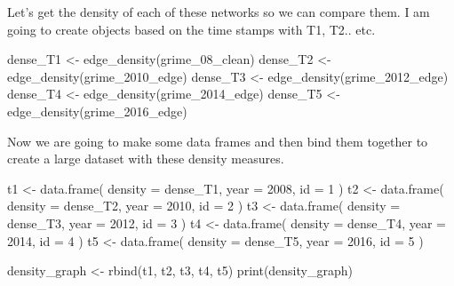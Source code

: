 \documentclass[
  letterpaper,
  DIV=11,
  numbers=noendperiod]{scrreprt}
\newenvironment{Shaded}{\begin{snugshade}}{\end{snugshade}}
\newcommand{\AttributeTok}[1]{\textcolor[rgb]{0.40,0.45,0.13}{#1}}
\newcommand{\DecValTok}[1]{\textcolor[rgb]{0.68,0.00,0.00}{#1}}
\newcommand{\FunctionTok}[1]{\textcolor[rgb]{0.28,0.35,0.67}{#1}}
\newcommand{\NormalTok}[1]{\textcolor[rgb]{0.00,0.23,0.31}{#1}}
\newcommand{\OtherTok}[1]{\textcolor[rgb]{0.00,0.23,0.31}{#1}}
\begin{document}
Let's get the density of each of these networks so we can compare them.
I am going to create objects based on the time stamps with T1, T2.. etc.

\begin{Shaded}
\begin{Highlighting}[]
\NormalTok{dense\_T1 }\OtherTok{\textless{}{-}} \FunctionTok{edge\_density}\NormalTok{(grime\_08\_clean)}
\NormalTok{dense\_T2 }\OtherTok{\textless{}{-}} \FunctionTok{edge\_density}\NormalTok{(grime\_2010\_edge)}
\NormalTok{dense\_T3 }\OtherTok{\textless{}{-}} \FunctionTok{edge\_density}\NormalTok{(grime\_2012\_edge)}
\NormalTok{dense\_T4 }\OtherTok{\textless{}{-}} \FunctionTok{edge\_density}\NormalTok{(grime\_2014\_edge)}
\NormalTok{dense\_T5 }\OtherTok{\textless{}{-}} \FunctionTok{edge\_density}\NormalTok{(grime\_2016\_edge)}
\end{Highlighting}
\end{Shaded}

Now we are going to make some data frames and then bind them together to
create a large dataset with these density measures.

\begin{Shaded}
\begin{Highlighting}[]
\NormalTok{t1 }\OtherTok{\textless{}{-}} \FunctionTok{data.frame}\NormalTok{(}
\AttributeTok{density =}\NormalTok{ dense\_T1,}
\AttributeTok{year =} \DecValTok{2008}\NormalTok{,}
\AttributeTok{id =} \DecValTok{1}
\NormalTok{)}
\NormalTok{t2 }\OtherTok{\textless{}{-}} \FunctionTok{data.frame}\NormalTok{(}
\AttributeTok{density =}\NormalTok{ dense\_T2,}
\AttributeTok{year =} \DecValTok{2010}\NormalTok{,}
\AttributeTok{id =} \DecValTok{2}
\NormalTok{)}
\NormalTok{t3 }\OtherTok{\textless{}{-}} \FunctionTok{data.frame}\NormalTok{(}
\AttributeTok{density =}\NormalTok{ dense\_T3,}
\AttributeTok{year =} \DecValTok{2012}\NormalTok{,}
\AttributeTok{id =} \DecValTok{3}
\NormalTok{)}
\NormalTok{t4 }\OtherTok{\textless{}{-}} \FunctionTok{data.frame}\NormalTok{(}
\AttributeTok{density =}\NormalTok{ dense\_T4,}
\AttributeTok{year =} \DecValTok{2014}\NormalTok{,}
\AttributeTok{id =} \DecValTok{4}
\NormalTok{)}
\NormalTok{t5 }\OtherTok{\textless{}{-}} \FunctionTok{data.frame}\NormalTok{(}
\AttributeTok{density =}\NormalTok{ dense\_T5,}
\AttributeTok{year =} \DecValTok{2016}\NormalTok{,}
\AttributeTok{id =} \DecValTok{5}
\NormalTok{)}

\NormalTok{density\_graph }\OtherTok{\textless{}{-}} \FunctionTok{rbind}\NormalTok{(t1, t2, t3, t4, t5)}
\FunctionTok{print}\NormalTok{(density\_graph)}
\end{Highlighting}
\end{Shaded}
\end{document}
